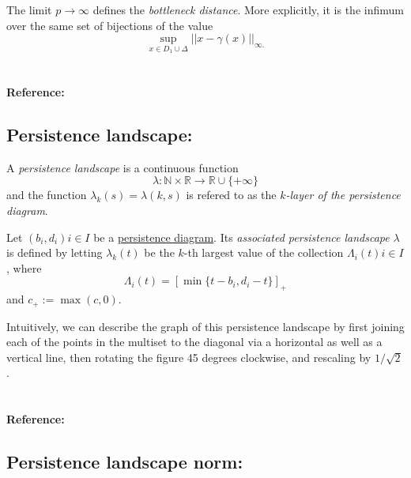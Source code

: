 \documentclass{amsart}
\begin{document}
	The limit $p \to \infty$ defines the \textit{bottleneck distance}. More explicitly, it is the infimum over the same set of bijections of the value
	\begin{equation*}
	\sup_{x \in D_1 \cup \Delta} ||x - \gamma(x)||_{\infty.}
	\end{equation*}

	\paragraph{\\ Reference:} \cite{kerber2017geometry}
	
	\subsection*{Persistence  landscape:} \label{persistence landscape}

	A \textit{persistence landscape} is a continuous function
	\begin{equation*}
	\lambda : \mathbb N \times \mathbb R \to \mathbb R \cup \{+\infty\}
	\end{equation*}
	and the function $\lambda_k(s) = \lambda(k,s)$ is refered to as the \textit{$k$-layer of the persistence diagram}.

  Let ${(b_i, d_i)}{i \in I}$ be a \hyperref[persistence diagram] {persistence diagram}. Its \textit{associated persistence landscape} $\lambda$ is defined by letting $\lambda_k(t)$ be the $k$-th largest value of the collection ${ \Lambda_i(t) }{i \in I}$, where
	\begin{equation*}
	\Lambda_i(t) = \left[ \min \{t-b_i, d_i-t\}\right]_+
	\end{equation*}
	and $c_+ := \max(c,0)$.
	
	Intuitively, we can describe the graph of this persistence landscape by first joining each of the points in the multiset to the diagonal via a horizontal as well as a vertical line, then rotating the figure 45 degrees clockwise, and rescaling by $1/\sqrt{2}$.

	\paragraph{\\ Reference:} \cite{bubenik2015statistical}
	
	\subsection*{Persistence landscape norm:} \label{persistence landscape norm}
	
\end{document}
